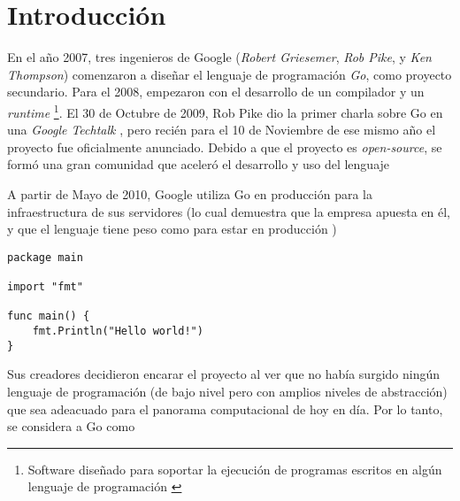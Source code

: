 







\clearpage
\tableofcontents
\clearpage 

\lstset{style=go}

\section{Introducción}

En el año 2007, tres ingenieros de Google (\emph{Robert Griesemer}, \emph{Rob Pike}, y \emph{Ken Thompson}) comenzaron a diseñar el lenguaje de programación \emph{Go}, como proyecto secundario. Para el 2008, empezaron con el desarrollo de un compilador y un \emph{runtime} \footnote{Software diseñado para soportar la ejecución de programas escritos en algún lenguaje de programación \autocite{Wikipedia:runtime}}. El 30 de Octubre de 2009, Rob Pike dio la primer charla sobre Go en una \emph{Google Techtalk} \autocite{TheGoProgrammingLanguage}, pero recién para el 10 de Noviembre de ese mismo año el proyecto fue oficialmente anunciado. Debido a que el proyecto es \emph{open-source}, se formó una gran comunidad que aceleró el desarrollo y uso del lenguaje 

A partir de Mayo de 2010, Google utiliza Go en producción para la infraestructura de sus servidores (lo cual demuestra que la empresa apuesta en él, y que el lenguaje tiene peso como para estar en producción \autocite{TheWayToGo})

\vspace*{10mm}
\begin{lstlisting}[title=\dq{Hola mundo} en Go]
package main

import "fmt"

func main() {
    fmt.Println("Hello world!")
}
\end{lstlisting}


Sus creadores decidieron encarar el proyecto al ver que no había surgido ningún lenguaje de programación (de bajo nivel pero con amplios niveles de abstracción) que sea adeacuado para el panorama computacional de hoy en día. Por lo tanto, se considera a Go como  \autocite{BookTheGoProgrammingLanguage} 

